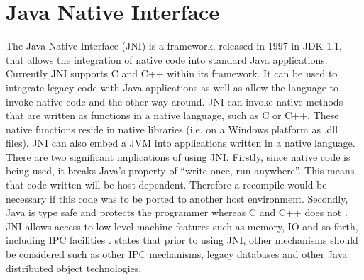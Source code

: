\documentclass[12pt] {newrucsthesis}    %
\begin{document}
    \section{Java Native Interface}
      The Java Native Interface (JNI) is a framework, released in 1997 in JDK 1.1, that allows the
      integration of native code into standard Java applications. Currently JNI supports C and C++
      within its framework. It can be used to integrate legacy code with Java applications as well as
      allow the language to invoke native code and the other way around. JNI can invoke native methods
      that are written as functions in a native language, such as C or C++. These native functions reside
      in native libraries (i.e. on a Windows platform as .dll files). JNI can also embed a JVM into applications
      written in a native language. There are two significant implications of using JNI. Firstly, since native
      code is being used, it breaks Java's property of “write once, run anywhere”. This means that code written
      will be host dependent. Therefore a recompile would be necessary if this code was to be ported to another
      host environment. Secondly, Java is type safe and protects the programmer whereas C and C++ does not
      \citep{LiangJNISpecification}. JNI allows access to low-level machine features such as memory, IO
      and so forth, including IPC facilities \citep{IBM2009}. \cite{LiangJNISpecification} states that
      prior to using JNI, other mechanisms should be considered such as other IPC mechanisms, legacy
      databases and other Java distributed object technologies.
\end{document}
